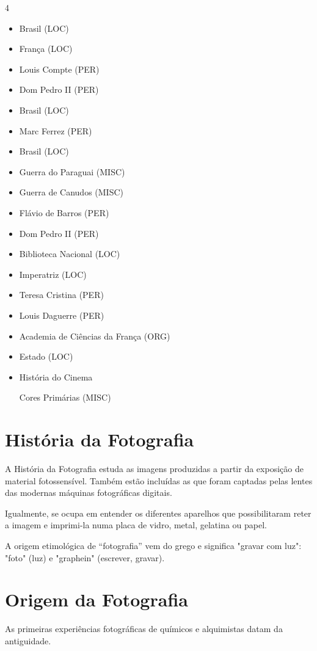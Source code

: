 \documentclass{article}
\begin{document}
\begin{multicols}{4}
\begin{itemize}
\item Brasil (LOC)
\item França (LOC)
\item Louis Compte (PER)
\item Dom Pedro II (PER)
\item Brasil (LOC)
\item Marc Ferrez (PER)
\item Brasil (LOC)
\item Guerra do Paraguai (MISC)
\item Guerra de Canudos (MISC)
\item Flávio de Barros (PER)
\item Dom Pedro II (PER)
\item Biblioteca Nacional (LOC)
\item Imperatriz (LOC)
\item Teresa Cristina (PER)
\item Louis Daguerre (PER)
\item Academia de Ciências da França (ORG)
\item Estado (LOC)
\item História do Cinema

Cores Primárias (MISC)

\end{itemize}
\end{multicols}
\section{História da Fotografia}

A História da Fotografia estuda as imagens produzidas a partir da exposição de material fotossensível. Também estão incluídas as que foram captadas pelas lentes das modernas máquinas fotográficas digitais.

Igualmente, se ocupa em entender os diferentes aparelhos que possibilitaram reter a imagem e imprimi-la numa placa de vidro, metal, gelatina ou papel.

A origem etimológica de “fotografia” vem do grego e significa "gravar com luz": "foto" (luz) e "graphein" (escrever, gravar).



\section{Origem da Fotografia}

As primeiras experiências fotográficas de químicos e alquimistas datam da antiguidade.
\end{document}
